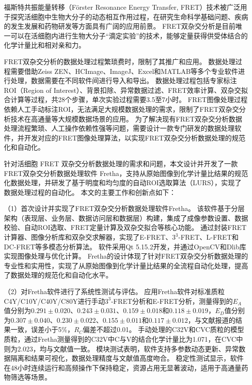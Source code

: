 \begin{cabstract}

\ifshowtext
福斯特共振能量转移（Förster Resonance Energy Transfer, FRET）技术被广泛用于探究活细胞中生物大分子的动态相互作用过程，在研究生命科学基础问题、疾病的发生发展和药物研发等方面具有广阔的应用前景。
FRET双杂交分析是目前唯一可以在活细胞内进行生物大分子“滴定实验”的技术，能够定量获得供受体结合的化学计量比和相对亲和力。

FRET双杂交分析的数据处理过程繁琐费时，限制了其推广和应用。
数据处理过程需要借助Zeiss ZEN、HCImage、ImageJ、Excel和MATLAB等多个专业软件进行处理，数据需要在不同软件间进行导入和导出。
数据处理过程包括专家标注ROI（Region of Interest）、背景扣除、异常数据过滤、FRET效率计算、双杂交拟合计算等过程，共28个步骤，单次实验过程需要3.5至7小时。
FRET图像处理过程依赖人工手动标注ROI，无法满足大规模数据处理的需求，限制了FRET双杂交分析技术在高通量等大规模数据场景的应用。
为了解决现有FRET双杂交分析数据处理流程繁琐、人工操作依赖性强等问题，需要设计一款专门研发的数据处理软件，并开发对应的FRET图像处理算法，以实现FRET双杂交分析数据处理的规范化和自动化。

针对活细胞 FRET 双杂交分析数据处理的需求和问题，本文设计并开发了一款FRET双杂交分析数据处理软件 Fretha，支持从原始图像到化学计量比结果的规范化数据处理，并研发了基于明度和均匀度的自动ROI选取算法（LURS），实现了数据处理过程的自动化。
本文的主要工作和创新点如下：

（1）首次设计并实现了FRET双杂交分析数据处理软件Fretha。
该软件基于分层架构（表现层、业务层、数据访问层和数据层）构建，集成了成像参数设置、数据校验、自动ROI选取、FRET定量计算及双杂交拟合等核心功能。
通过封装FRET计算器、图像分析库和双杂交求解器，实现了E-FRET、$3^3$-FRET、L-FRET和DC-FRET等多模态分析算法。
软件采用Qt 5.15.2开发，并通过OpenCV和Dlib库实现图像处理与优化计算。
Fretha的设计体现了针对FRET双杂交分析数据处理的专业性和实用性，实现了从原始图像到化学计量比结果的全流程自动化处理，提高了数据处理的规范化和自动化水平。

（2）对Fretha软件进行了系统性测试与评估。
应用Fretha软件对标准质粒C4Y/C10Y/C40Y/C80Y进行手动$3^3$-FRET分析和E-FRET分析，测量得到的$E_{A}$值分别为$0.291\pm0.020$、$0.243\pm0.031$、$0.159\pm0.018$和$0.118\pm0.019$，$E_{D}$值分别为$0.307\pm0.040$、$0.230\pm0.022$、$0.155\pm0.011$和$0.117\pm0.012$，与文献报道的结果一致，误差小于5\%，$R_{C}$偏差不超过0.01。
手动处理的C32V和CVC质粒的模型质粒，通过Fretha测量得到的C32V中C与V的结合化学计量比为1.071，在CVC中则为2.023，均与文献值一致。
模块测试表明，软件支持多参数动态更新、异常数据隔离和结果可视化，数据处理精度与文献值高度吻合。
稳定性测试显示，软件在48小时连续运行和高频操作下保持稳定，资源占用无显著波动，适用于高通量药物筛选等场景。


\end{cabstract}
